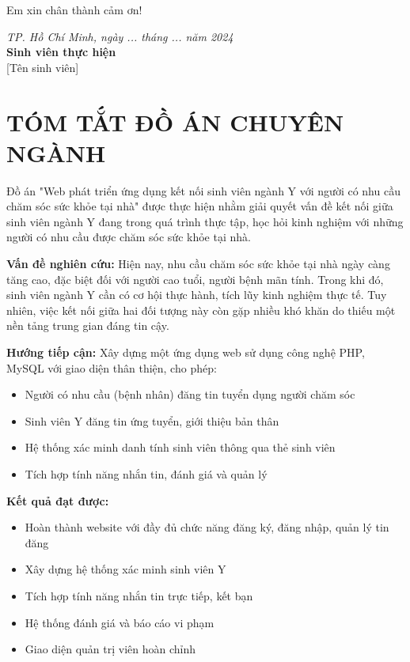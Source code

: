 \documentclass[13pt,a4paper]{extreport}
\begin{document}
Em xin chân thành cảm ơn!

\vspace{1cm}
\begin{flushright}
\textit{TP. Hồ Chí Minh, ngày ... tháng ... năm 2024}\\
\textbf{Sinh viên thực hiện}\\[1cm]
[Tên sinh viên]
\end{flushright}

\tableofcontents
\newpage

\listoffigures
{}
\newpage

\listoftables
{}
\newpage

\chapter*{TÓM TẮT ĐỒ ÁN CHUYÊN NGÀNH}

Đồ án "Web phát triển ứng dụng kết nối sinh viên ngành Y với người có nhu cầu chăm sóc sức khỏe tại nhà" được thực hiện nhằm giải quyết vấn đề kết nối giữa sinh viên ngành Y đang trong quá trình thực tập, học hỏi kinh nghiệm với những người có nhu cầu được chăm sóc sức khỏe tại nhà.

\textbf{Vấn đề nghiên cứu:} Hiện nay, nhu cầu chăm sóc sức khỏe tại nhà ngày càng tăng cao, đặc biệt đối với người cao tuổi, người bệnh mãn tính. Trong khi đó, sinh viên ngành Y cần có cơ hội thực hành, tích lũy kinh nghiệm thực tế. Tuy nhiên, việc kết nối giữa hai đối tượng này còn gặp nhiều khó khăn do thiếu một nền tảng trung gian đáng tin cậy.

\textbf{Hướng tiếp cận:} Xây dựng một ứng dụng web sử dụng công nghệ PHP, MySQL với giao diện thân thiện, cho phép:
\begin{itemize}
    \item Người có nhu cầu (bệnh nhân) đăng tin tuyển dụng người chăm sóc
    \item Sinh viên Y đăng tin ứng tuyển, giới thiệu bản thân
    \item Hệ thống xác minh danh tính sinh viên thông qua thẻ sinh viên
    \item Tích hợp tính năng nhắn tin, đánh giá và quản lý
\end{itemize}

\textbf{Kết quả đạt được:}
\begin{itemize}
    \item Hoàn thành website với đầy đủ chức năng đăng ký, đăng nhập, quản lý tin đăng
    \item Xây dựng hệ thống xác minh sinh viên Y
    \item Tích hợp tính năng nhắn tin trực tiếp, kết bạn
    \item Hệ thống đánh giá và báo cáo vi phạm
    \item Giao diện quản trị viên hoàn chỉnh
\end{itemize}
\end{document}
